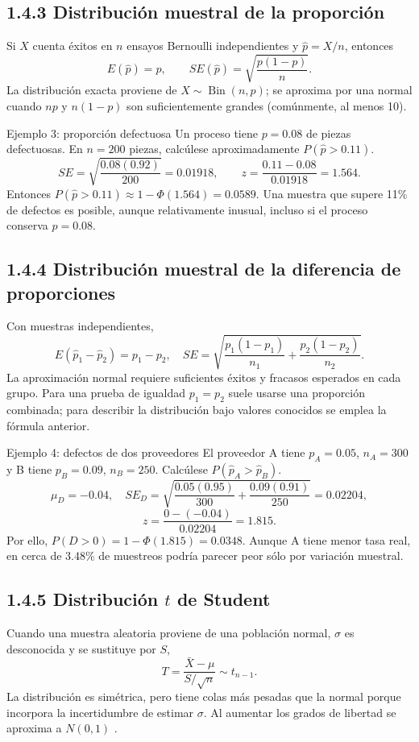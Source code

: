\subsection{1.4.3 Distribución muestral de la proporción}
Si $X$ cuenta éxitos en $n$ ensayos Bernoulli independientes y $\hat p=X/n$, entonces
\[
 E(\hat p)=p,\qquad SE(\hat p)=\sqrt{\frac{p(1-p)}{n}}.
\]
La distribución exacta proviene de $X\sim\operatorname{Bin}(n,p)$; se aproxima por una normal cuando $np$ y $n(1-p)$ son suficientemente grandes (comúnmente, al menos 10).

\begin{examplebox}{Ejemplo 3: proporción defectuosa}
Un proceso tiene $p=0.08$ de piezas defectuosas. En $n=200$ piezas, calcúlese aproximadamente $P(\hat p>0.11)$.
\[
 SE=\sqrt{\frac{0.08(0.92)}{200}}=0.01918,\qquad
 z=\frac{0.11-0.08}{0.01918}=1.564.
\]
Entonces $P(\hat p>0.11)\approx1-\Phi(1.564)=0.0589$. Una muestra que supere 11\% de defectos es posible, aunque relativamente inusual, incluso si el proceso conserva $p=0.08$.
\end{examplebox}

\subsection{1.4.4 Distribución muestral de la diferencia de proporciones}
Con muestras independientes,
\[
 E(\hat p_1-\hat p_2)=p_1-p_2,
\quad SE=\sqrt{\frac{p_1(1-p_1)}{n_1}+\frac{p_2(1-p_2)}{n_2}}.
\]
La aproximación normal requiere suficientes éxitos y fracasos esperados en cada grupo. Para una prueba de igualdad $p_1=p_2$ suele usarse una proporción combinada; para describir la distribución bajo valores conocidos se emplea la fórmula anterior.

\begin{examplebox}{Ejemplo 4: defectos de dos proveedores}
El proveedor A tiene $p_A=0.05$, $n_A=300$ y B tiene $p_B=0.09$, $n_B=250$. Calcúlese $P(\hat p_A>\hat p_B)$.
\[
 \mu_D=-0.04,\quad SE_D=\sqrt{\frac{0.05(0.95)}{300}+\frac{0.09(0.91)}{250}}=0.02204,
\]
\[
 z=\frac{0-(-0.04)}{0.02204}=1.815.
\]
Por ello, $P(D>0)=1-\Phi(1.815)=0.0348$. Aunque A tiene menor tasa real, en cerca de 3.48\% de muestreos podría parecer peor sólo por variación muestral.
\end{examplebox}

\subsection{1.4.5 Distribución $t$ de Student}
Cuando una muestra aleatoria proviene de una población normal, $\sigma$ es desconocida y se sustituye por $S$,
\[
 T=\frac{\bar X-\mu}{S/\sqrt n}\sim t_{n-1}.
\]
La distribución es simétrica, pero tiene colas más pesadas que la normal porque incorpora la incertidumbre de estimar $\sigma$. Al aumentar los grados de libertad se aproxima a $N(0,1)$ \citep{nistStudent}.

